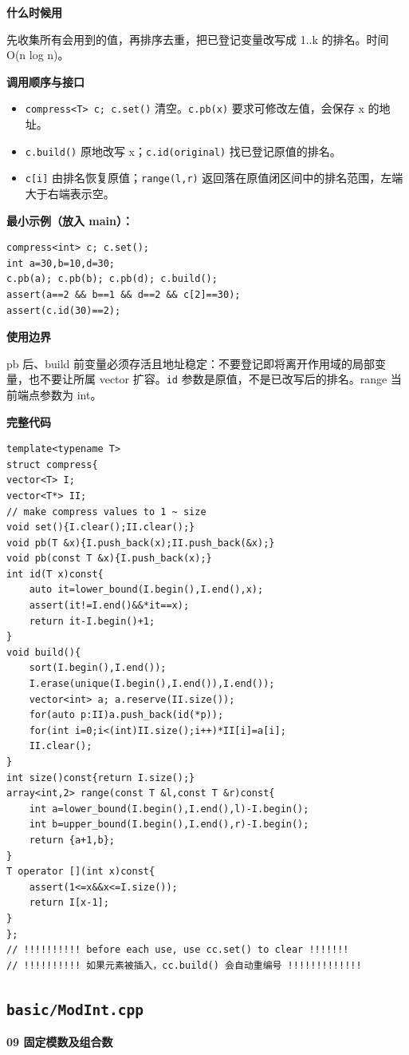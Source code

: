 \documentclass[UTF8,a4paper,10pt]{ctexart}
\newcommand{\TemplUsage}[1]{\textbf{什么时候用}\par #1\par}
\newcommand{\TemplApi}[1]{\textbf{调用顺序与接口}\par #1\par}
\newcommand{\TemplNote}[1]{\textbf{使用边界}\par #1\par}
\begin{document}
\TemplUsage{先收集所有会用到的值，再排序去重，把已登记变量改写成 1..k 的排名。时间 O(n log n)。}
\TemplApi{\begin{itemize}
\item \texttt{compress<T> c; c.set()} 清空。\texttt{c.pb(x)} 要求可修改左值，会保存 x 的地址。
\item \texttt{c.build()} 原地改写 x；\texttt{c.id(original)} 找已登记原值的排名。
\item \texttt{c[i]} 由排名恢复原值；\texttt{range(l,r)} 返回落在原值闭区间中的排名范围，左端大于右端表示空。
\end{itemize}}
\textbf{最小示例（放入 main）：}
\begin{lstlisting}
compress<int> c; c.set();
int a=30,b=10,d=30;
c.pb(a); c.pb(b); c.pb(d); c.build();
assert(a==2 && b==1 && d==2 && c[2]==30);
assert(c.id(30)==2);
\end{lstlisting}
\TemplNote{pb 后、build 前变量必须存活且地址稳定：不要登记即将离开作用域的局部变量，也不要让所属 vector 扩容。\texttt{id} 参数是原值，不是已改写后的排名。range 当前端点参数为 int。}
\textbf{完整代码}
\begin{lstlisting}[firstnumber=1]
template<typename T>
struct compress{
vector<T> I;
vector<T*> II;
// make compress values to 1 ~ size
void set(){I.clear();II.clear();}
void pb(T &x){I.push_back(x);II.push_back(&x);}
void pb(const T &x){I.push_back(x);}
int id(T x)const{
	auto it=lower_bound(I.begin(),I.end(),x);
	assert(it!=I.end()&&*it==x);
	return it-I.begin()+1;
}
void build(){
	sort(I.begin(),I.end());
	I.erase(unique(I.begin(),I.end()),I.end());
	vector<int> a; a.reserve(II.size());
	for(auto p:II)a.push_back(id(*p));
	for(int i=0;i<(int)II.size();i++)*II[i]=a[i];
	II.clear();
}
int size()const{return I.size();}
array<int,2> range(const T &l,const T &r)const{
	int a=lower_bound(I.begin(),I.end(),l)-I.begin();
	int b=upper_bound(I.begin(),I.end(),r)-I.begin();
	return {a+1,b};
}
T operator [](int x)const{
	assert(1<=x&&x<=I.size());
	return I[x-1];
}
};
// !!!!!!!!!! before each use, use cc.set() to clear !!!!!!!
// !!!!!!!!!! 如果元素被插入，cc.build() 会自动重编号 !!!!!!!!!!!!!
\end{lstlisting}
\par\vspace{1em}
\subsection{\texttt{basic/ModInt.cpp}}
\textbf{09 固定模数及组合数}
\end{document}
